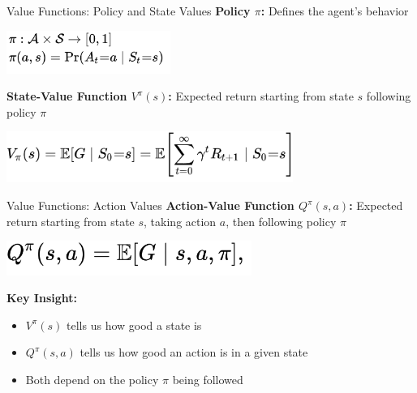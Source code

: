 \documentclass[aspectratio=169]{beamer}
\begin{document}
\begin{frame}{Value Functions: Policy and State Values}
  \textbf{Policy $\pi$:} Defines the agent's behavior
  \begin{center}
    \includegraphics[width=0.4\textwidth]{images/policy.png}
  \end{center}
  
  \vspace{0.5cm}
  \textbf{State-Value Function $V^\pi(s)$:} Expected return starting from state $s$ following policy $\pi$
  \begin{center}
    \includegraphics[width=0.7\textwidth]{images/valuefunct.png}
  \end{center}
\end{frame}

\begin{frame}{Value Functions: Action Values}
  \textbf{Action-Value Function $Q^\pi(s,a)$:} Expected return starting from state $s$, taking action $a$, then following policy $\pi$
  
  \vspace{0.5cm}
  \begin{center}
    \includegraphics[width=0.6\textwidth]{images/qvalue.png}
  \end{center}
  
  \vspace{0.5cm}
  \textbf{Key Insight:}
  \begin{itemize}
    \item $V^\pi(s)$ tells us how good a state is
    \item $Q^\pi(s,a)$ tells us how good an action is in a given state
    \item Both depend on the policy $\pi$ being followed
  \end{itemize}
\end{frame}
\end{document}
